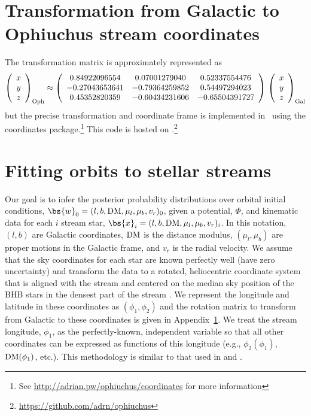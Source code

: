 \documentclass[letterpaper,12pt,preprint]{aastex}
\newcommand{\DM}{{\rm DM}}
\begin{document}
\section{Transformation from Galactic to Ophiuchus stream coordinates} \label{sec:rotationmatrix}
The transformation matrix is approximately represented as
\begin{equation*}
\left( \begin{array}{c}
x \\
y \\
z \end{array} \right)_{\rm Oph} \approx
\left( \begin{array}{ccc}
0.84922096554 & 0.07001279040 & 0.52337554476\\
-0.27043653641 & -0.79364259852 &  0.54497294023\\
0.45352820359 & -0.60434231606 & -0.65504391727
\end{array} \right) \,
\left( \begin{array}{c}
x \\
y \\
z \end{array} \right)_{\rm Gal}
\end{equation*}
but the precise transformation and coordinate frame is implemented in \python\ using the  coordinates package.\footnote{See \url{http://adrian.pw/ophiuchus/coordinates} for more information}  This code is hosted on .\footnote{\url{https://github.com/adrn/ophiuchus}} 

\section{Fitting orbits to stellar streams}\label{sec:orbitfit}

Our goal is to infer the posterior probability distributions over orbital initial conditions, $\bs{w}_0=(l, b, \DM, \mu_l, \mu_b, v_r)_0$, given a potential, $\Phi$, and kinematic data for each $i$ stream star, $\bs{x}_i=(l, b, \DM, \mu_l, \mu_b, v_r)_i$. In this notation, $(l, b)$ are Galactic coordinates, $\DM$ is the distance modulus, $(\mu_l, \mu_b)$ are proper motions in the Galactic frame, and $v_r$ is the radial velocity. We assume that the sky coordinates for each star are known perfectly well (have zero uncertainty) and transform the data to a rotated, heliocentric coordinate system that is aligned with the stream and centered on the median sky position of the BHB stars in the densest part of the stream \cite[all BHB stars except the `fanned' stars: cand15, cand26, cand49, cand54 from][]{sesar15b}. We represent the longitude and latitude in these coordinates as $(\phi_1, \phi_2)$ and the rotation matrix to transform from Galactic to these coordinates is given in Appendix~\ref{sec:rotationmatrix}. We treat the stream longitude, $\phi_1$, as the perfectly-known, independent variable so that all other coordinates can be expressed as functions of this longitude (e.g., $\phi_2(\phi_1)$, ${\rm DM}(\phi_1)$, etc.). This methodology is similar to that used in \cite{koposov10} and \cite{sesar15a}.
\end{document}
